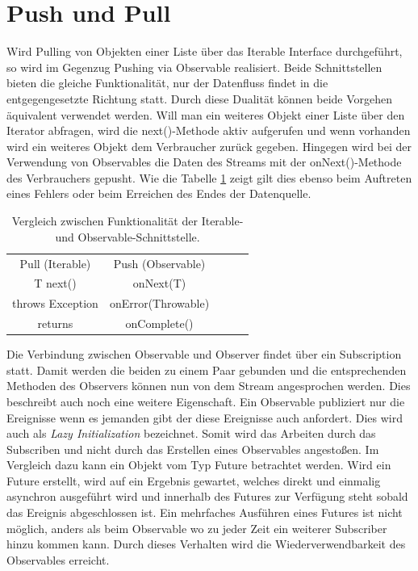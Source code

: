 \section{Push und Pull}
Wird Pulling von Objekten einer Liste über das Iterable Interface durchgeführt, so wird im Gegenzug Pushing via Observable realisiert. Beide Schnittstellen bieten die gleiche Funktionalität, nur der Datenfluss findet in die entgegengesetzte Richtung statt. Durch diese Dualität können beide Vorgehen äquivalent verwendet werden. Will man ein weiteres Objekt einer Liste über den Iterator abfragen, wird die next()-Methode aktiv aufgerufen und wenn vorhanden wird ein weiteres Objekt dem Verbraucher zurück gegeben. Hingegen wird bei der Verwendung von Observables die Daten des Streams mit der onNext()-Methode des Verbrauchers gepusht. Wie die Tabelle \ref{tbl:vglIterObs} zeigt gilt dies ebenso beim Auftreten eines Fehlers oder beim Erreichen des Endes der Datenquelle.
\begin{table}[]
	\centering
	\begin{tabular}{|c|c|lll}
		\cline{1-2}
		\cellcolor[HTML]{C0C0C0}Pull (Iterable) & \cellcolor[HTML]{C0C0C0}Push (Observable) &  &  &  \\ \cline{1-2}
		T next()                                & onNext(T)                                 &  &  &  \\ \cline{1-2}
		throws Exception                        & onError(Throwable)                        &  &  &  \\ \cline{1-2}
		returns                                 & onComplete()                             &  &  &  \\ \cline{1-2}
	\end{tabular}
	\caption{Vergleich zwischen Funktionalität der Iterable- und Observable-Schnittstelle.}
	\label{tbl:vglIterObs}
\end{table}
Die Verbindung zwischen Observable und Observer findet über ein Subscription statt. Damit werden die beiden zu einem Paar gebunden und die entsprechenden Methoden des Observers können nun von dem Stream angesprochen werden. Dies beschreibt auch noch eine weitere Eigenschaft. Ein Observable publiziert nur die Ereignisse wenn es jemanden gibt der diese Ereignisse auch anfordert. Dies wird auch als \textit{Lazy Initialization} bezeichnet. Somit wird das Arbeiten durch das Subscriben und nicht durch das Erstellen eines Observables angestoßen. Im Vergleich dazu kann ein Objekt vom Typ Future betrachtet werden. Wird ein Future erstellt, wird auf ein Ergebnis gewartet, welches direkt und einmalig asynchron ausgeführt wird und innerhalb des Futures zur Verfügung steht sobald das Ereignis abgeschlossen ist. Ein mehrfaches Ausführen eines Futures ist nicht möglich, anders als beim Observable wo zu jeder Zeit ein weiterer Subscriber hinzu kommen kann. Durch dieses Verhalten wird die Wiederverwendbarkeit des Observables erreicht. 
